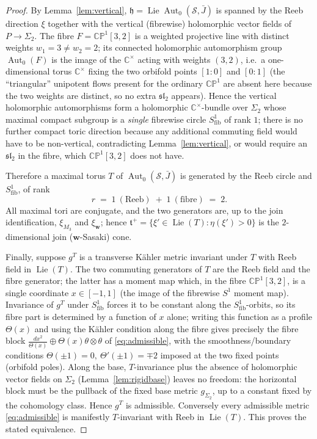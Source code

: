 \documentclass{amsart}
\theoremstyle{definition}
\DeclareMathOperator{\Aut}{Aut}
\DeclareMathOperator{\Lie}{Lie}
\begin{document}
\begin{proof}
By Lemma~\ref{lem:vertical}, $\mathfrak h=\Lie\Aut_0(\mathcal S,\bar J)$ is
spanned by the Reeb direction $\xi$ together with the vertical (fibrewise)
holomorphic vector fields of $P\to\Sigma_2$. The fibre $F=\mathbb{CP}^1[3,2]$ is
a weighted projective line with distinct weights $w_1=3\neq w_2=2$; its
connected holomorphic automorphism group $\Aut_0(F)$ is the image of the
$\mathbb C^\times$ acting with weights $(3,2)$, i.e.\ a one-dimensional torus
$\mathbb C^\times$ fixing the two orbifold points $[1:0]$ and $[0:1]$ (the
``triangular'' unipotent flows present for the ordinary $\mathbb{CP}^1$ are
absent here because the two weights are distinct, so no extra $\mathfrak{sl}_2$
appears). Hence the vertical holomorphic automorphisms form a holomorphic
$\mathbb C^\times$-bundle over $\Sigma_2$ whose maximal compact subgroup is a
\emph{single} fibrewise circle $S^1_{\mathrm{fib}}$ of rank $1$; there is no
further compact toric direction because any additional commuting field would
have to be non-vertical, contradicting Lemma~\ref{lem:vertical}, or would
require an $\mathfrak{sl}_2$ in the fibre, which $\mathbb{CP}^1[3,2]$ does not
have.

Therefore a maximal torus $T$ of $\Aut_0(\mathcal S,\bar J)$ is generated by the
Reeb circle and $S^1_{\mathrm{fib}}$, of rank
\[
  r \;=\; 1\ (\text{Reeb}) \;+\; 1\ (\text{fibre}) \;=\; 2 .
\]
All maximal tori are conjugate, and the two generators are, up to the join
identification, $\xi_{M_3}$ and $\xi_{\mathbf w}$; hence
$\mathfrak t^+=\{\xi'\in\Lie(T):\eta(\xi')>0\}$ is the $2$-dimensional join
($\mathbf w$-Sasaki) cone.

Finally, suppose $g^T$ is a transverse K\"ahler metric invariant under $T$ with
Reeb field in $\Lie(T)$. The two commuting generators of $T$ are the Reeb field
and the fibre generator; the latter has a moment map which, in the fibre
$\mathbb{CP}^1[3,2]$, is a single coordinate $x\in[-1,1]$ (the image of the
fibrewise $S^1$ moment map). Invariance of $g^T$ under $S^1_{\mathrm{fib}}$
forces it to be constant along the $S^1_{\mathrm{fib}}$-orbits, so its fibre part
is determined by a function of $x$ alone; writing this function as a profile
$\Theta(x)$ and using the K\"ahler condition along the fibre gives precisely the
fibre block $\frac{dx^2}{\Theta(x)}\oplus\Theta(x)\theta\otimes\theta$ of
\eqref{eq:admissible}, with the smoothness/boundary conditions
$\Theta(\pm1)=0,\ \Theta'(\pm1)=\mp2$ imposed at the two fixed points
(orbifold poles). Along the base, $T$-invariance plus the absence of holomorphic
vector fields on $\Sigma_2$ (Lemma~\ref{lem:rigidbase}) leaves no freedom: the
horizontal block must be the pullback of the fixed base metric $g_{\Sigma_2}$,
up to a constant fixed by the cohomology class. Hence $g^T$ is admissible.
Conversely every admissible metric \eqref{eq:admissible} is manifestly
$T$-invariant with Reeb in $\Lie(T)$. This proves the stated equivalence.
\end{proof}
\end{document}
